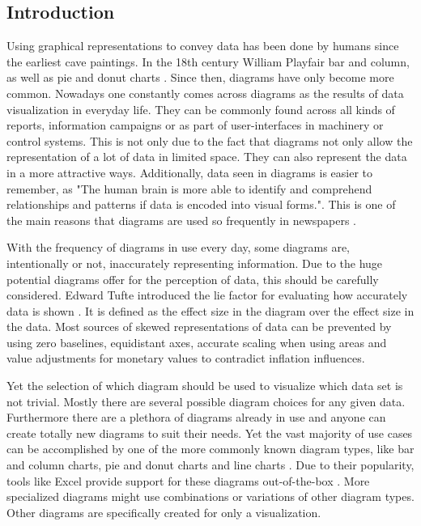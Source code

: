 \subsection{Introduction}
Using graphical representations to convey data has been done by humans since the earliest cave paintings. In the 18th century William Playfair bar and column, as well as pie and donut charts \cite{dur2012analysis}. Since then, diagrams have only become more common. Nowadays one constantly comes across diagrams as the results of data visualization in everyday life. They can be commonly found across all kinds of reports, information campaigns or as part of user-interfaces in machinery or control systems. This is not only due to the fact that diagrams not only allow the representation of a lot of data in limited space. They can also represent the data in a more attractive ways. Additionally, data seen in diagrams is easier to remember, as "The human brain is more able to identify and comprehend relationships and patterns if data is encoded into visual forms."\cite{cleveland1985elements}. This is one of the main reasons that diagrams are used so frequently in newspapers \cite{utt2000update}.

With the frequency of diagrams in use every day, some diagrams are, intentionally or not, inaccurately representing information. Due to the huge potential diagrams offer for the perception of data, this should be carefully considered. Edward Tufte introduced the lie factor for evaluating how accurately data is shown \cite{tufte}. It is defined as the effect size in the diagram over the effect size in the data. Most sources of skewed representations of data can be prevented by using zero baselines, equidistant axes, accurate scaling when using areas and value adjustments for monetary values to contradict inflation influences.

Yet the selection of which diagram should be used to visualize which data set is not trivial. Mostly there are several possible diagram choices for any given data. Furthermore there are a plethora of diagrams already in use and anyone can create totally new diagrams to suit their needs. Yet the vast majority of use cases can be accomplished by one of the more commonly known diagram types, like bar and column charts, pie and donut charts and line charts \cite{lankow2012infographics}. Due to their popularity, tools like Excel provide support for these diagrams out-of-the-box \cite{office_chart_types}. More specialized diagrams might use combinations or variations of other diagram types. Other diagrams are specifically created for only a visualization.


